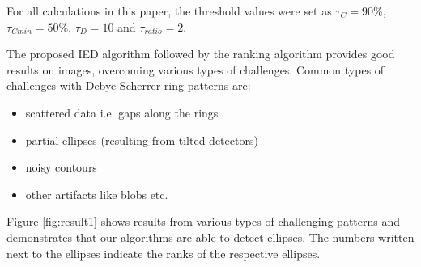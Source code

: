 \documentclass[preprint]{iucr}              %
\newcommand\dsr{Debye-Scherrer ring}
\begin{document}
For all calculations in this paper, the threshold values were set as ${\tau}_C=90\%$, ${\tau}_{Cmin}=50\%$, ${\tau}_D=10$ and ${\tau}_{ratio}=2$.

The proposed IED algorithm followed by the ranking algorithm provides good results on images, overcoming various types of challenges. Common types of challenges with {\dsr} patterns are:

\begin{itemize}
    \item scattered data i.e. gaps along the rings
    \item partial ellipses (resulting from tilted detectors)
    \item noisy contours
    \item other artifacts like blobs etc.
\end{itemize}

Figure \ref{fig:result1} shows results from various types of challenging patterns and demonstrates that our algorithms are able to detect ellipses. The numbers written next to the ellipses indicate the ranks of the respective ellipses.
\end{document}
